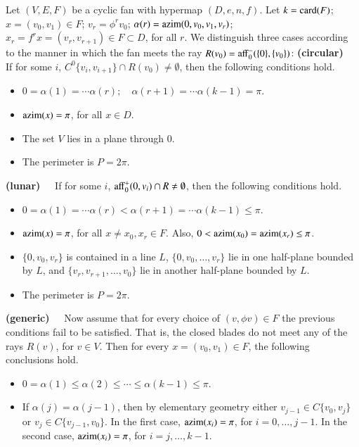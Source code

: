 \begin{lemma}[monotonicity]  Let $(V,E,F)$ be a cyclic fan with hypermap $(D,e,n,f)$.  Let $k={\operatorname{card}}(F)$; $x=(v_0,v_1)\in F$;  $v_r = \phi^r v_0$; $\alpha(r) = {\operatorname{azim}}(0,v_0,v_1,v_r)$;  $x_r = f^r x = (v_r,v_{r+1})\in F\subset D$, for all $r$.  
We distinguish three cases according to the manner in which the fan meets the ray $R(v_0) = {\operatorname{aff}}_0^-(\{0\},\{v_0\})$:
{\bf (circular)~~} If for some $i$, $C^0\{v_i,v_{i+1}\}\cap R(v_0)\ne \emptyset$, then the following conditions hold.
\begin{itemize}
\item $0=\alpha(1)=\cdots \alpha(r);\quad \alpha(r+1)=\cdots\alpha(k-1)=\pi$.
\item ${\operatorname{azim}}(x)=\pi$, for all $x\in D$.
\item The set $V$ lies in a plane through $0$.
\item The perimeter is $P=2\pi$.
\end{itemize}
{\bf (lunar)~~} If for some $i$, ${\operatorname{aff}}_0^+(0,v_i) \cap R\ne\emptyset$, then the following conditions hold.
\begin{itemize}
\item $0=\alpha(1)=\cdots \alpha(r) < \alpha(r+1)=\cdots\alpha(k-1)\le\pi$.
\item ${\operatorname{azim}}(x)=\pi$, for all $x\ne x_0,x_r\in F$.  Also, $0<{\operatorname{azim}}(x_0)={\operatorname{azim}}(x_r)\le \pi$.
\item $\{0,v_0,v_r\}$ is contained in a line $L$, $\{0,v_0,\ldots,v_r\}$ lie in one half-plane bounded by $L$, and $\{v_r,v_{r+1},\ldots,v_0\}$ lie in another half-plane bounded by $L$.
\item The perimeter is $P=2\pi$.
\end{itemize}

{\bf (generic)~~} Now assume that for every choice of $(v,\phi v)\in F$ the previous conditions fail to be satisfied.  That is, the closed blades do not meet any of the rays $R(v)$, for $v\in V$.  Then for every $x=(v_0,v_1)\in F$, the following conclusions hold.
\begin{itemize}
\item $0=\alpha(1)\le \alpha(2)\le \cdots\le \alpha(k-1)\le\pi$.
\item If $\alpha(j)=\alpha(j-1)$, then by elementary geometry either $v_{j-1}\in C\{v_0,v_j\}$ or $v_j\in C\{v_{j-1},v_0\}$.  In the first case,
${\operatorname{azim}}(x_i)=\pi$, for $i=0,\ldots,j-1$.  In the second case,
${\operatorname{azim}}(x_i)=\pi$, for $i=j,\ldots,k-1$.
\end{itemize}
\end{lemma}

